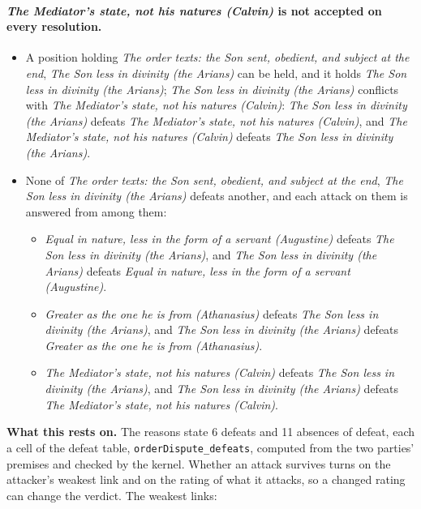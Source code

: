 \documentclass[11pt,paper=\testimonypaper,DIV=13,parskip=false]{scrartcl}
\begin{document}
\paragraph{\emph{The Mediator’s state, not his natures (Calvin)} is not accepted on every resolution.}
\begin{itemize}
\item A position holding \emph{The order texts: the Son sent, obedient, and subject at the end}, \emph{The Son less in divinity (the Arians)} can be held, and it holds \emph{The Son less in divinity (the Arians)}; \emph{The Son less in divinity (the Arians)} conflicts with \emph{The Mediator’s state, not his natures (Calvin)}: \emph{The Son less in divinity (the Arians)} defeats \emph{The Mediator’s state, not his natures (Calvin)}, and \emph{The Mediator’s state, not his natures (Calvin)} defeats \emph{The Son less in divinity (the Arians)}.
\item None of \emph{The order texts: the Son sent, obedient, and subject at the end}, \emph{The Son less in divinity (the Arians)} defeats another, and each attack on them is answered from among them:
\begin{itemize}
\item \emph{Equal in nature, less in the form of a servant (Augustine)} defeats \emph{The Son less in divinity (the Arians)}, and \emph{The Son less in divinity (the Arians)} defeats \emph{Equal in nature, less in the form of a servant (Augustine)}.
\item \emph{Greater as the one he is from (Athanasius)} defeats \emph{The Son less in divinity (the Arians)}, and \emph{The Son less in divinity (the Arians)} defeats \emph{Greater as the one he is from (Athanasius)}.
\item \emph{The Mediator’s state, not his natures (Calvin)} defeats \emph{The Son less in divinity (the Arians)}, and \emph{The Son less in divinity (the Arians)} defeats \emph{The Mediator’s state, not his natures (Calvin)}.
\end{itemize}
\end{itemize}
\par\noindent\textbf{What this rests on.} The reasons state 6 defeats and 11 absences of defeat, each a cell of the defeat table, \texttt{order\allowbreak{}Dispute\_\allowbreak{}defeats}, computed from the two parties' premises and checked by the kernel. Whether an attack survives turns on the attacker's weakest link and on the rating of what it attacks, so a changed rating can change the verdict. The weakest links:
\end{document}
